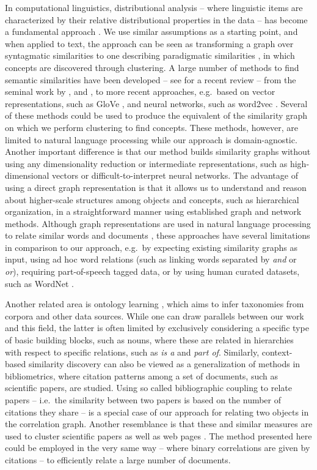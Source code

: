 \documentclass{sig-alternate}
\begin{document}
In computational linguistics, distributional analysis -- where linguistic items are characterized by
their relative distributional properties in the data -- has become a fundamental approach \cite{Harris-1970}. We use
similar assumptions as a starting point, and when applied to text, the approach can be seen as transforming a graph
over syntagmatic similarities to one describing paradigmatic similarities \cite{Sahlgren-2006}, in which
concepts are discovered through clustering. A large number of methods to find semantic similarities have been
developed -- see \cite{Harispe2015} for a recent review -- from the seminal work by \cite{Church90}, and \cite{Brown1992}, to more recent approaches, e.g.\ based on vector representations, such as GloVe
\cite{Pennington2014}, and neural networks, such as word2vec \cite{Mikolov-2013}.
Several of these methods could be used to produce the equivalent of the similarity graph on which we perform
clustering to find concepts. These methods, however, are limited to natural language processing while our approach
is domain-agnostic. Another important difference is that our method builds similarity graphs without
using any dimensionality reduction or intermediate representations, such as high-dimensional vectors
or difficult-to-interpret neural networks. The advantage of using a direct graph representation is that it allows us to
understand and reason about higher-scale structures among objects and concepts, such as hierarchical organization, in a straightforward
manner using established graph and network methods. Although graph representations are used in natural language processing to relate
similar words and documents \cite{Mihalcea2011}, these approaches have several limitations in comparison to our
approach, e.g.\ by expecting existing similarity graphs as input, using ad hoc word relations (such as linking words separated
by \emph{and} or \emph{or}), requiring part-of-speech tagged data, or by using human curated datasets, such as WordNet \cite{miller1995wordnet}.

Another related area is ontology learning \cite{Wong2012ontology}, which aims to infer taxonomies
from corpora and other data sources. While one can draw parallels between our work and this field, the latter is often limited
by exclusively considering a specific type of basic building blocks, such as nouns, where these are related in
 hierarchies with respect to specific relations, such as \emph{is a} and \emph{part of}. Similarly, context-based similarity
  discovery can also be viewed as a generalization of methods in bibliometrics, where citation patterns among a set of
  documents, such as scientific papers, are studied. Using so called bibliographic coupling to relate papers  \cite{Kessler1963}
  -- i.e.\ the similarity between two papers is based on the number of  citations they share -- is a special case of our approach
  for relating two objects in the correlation graph. Another resemblance is that  these and similar measures are used to cluster
  scientific papers \cite{Small1973} as well as web pages \cite{Larson96}. The method presented here could be employed in
  the very same way -- where binary correlations are given by citations -- to efficiently relate a large number of documents.
\end{document}
